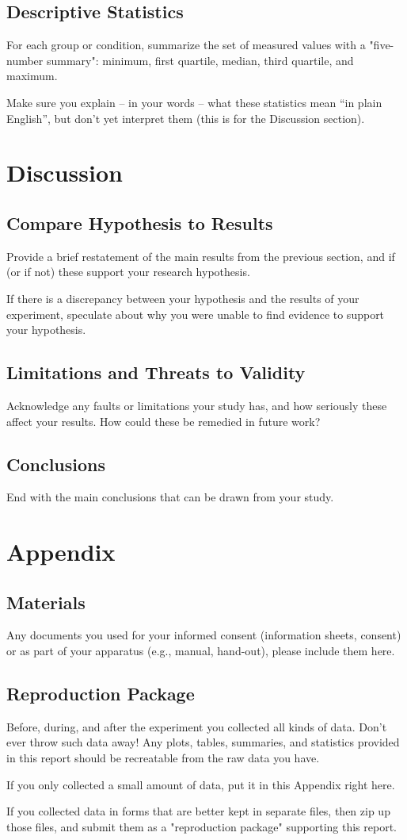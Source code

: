 \documentclass{article}
\begin{document}
\subsection{Descriptive Statistics}
For each group or condition, summarize the set of measured values with a "five-number summary": minimum, first quartile, median, third quartile, and maximum. 

Make sure you explain – in your words – what these statistics mean “in plain English”, but don’t yet interpret them (this is for the Discussion section).

\section{Discussion}
\subsection{Compare Hypothesis to Results}
Provide a brief restatement of the main results from the previous section, and if (or if not) these support your research hypothesis.

If there is a discrepancy between your hypothesis and the results of your experiment, speculate about why you were unable to find evidence to support your hypothesis. 


\subsection{Limitations and Threats to Validity}
Acknowledge any faults or limitations your study has, and how seriously these affect your
results. How could these be remedied in future work?

\subsection{Conclusions}
End with the main conclusions that can be drawn from your study.

\section{Appendix}
\subsection{Materials}
Any documents you used for your informed consent (information sheets, consent) or as part of your apparatus (e.g., manual, hand-out), please include them here.

\subsection{Reproduction Package}
Before, during, and after the experiment you collected all kinds of data. Don't ever throw such data away! Any plots, tables, summaries, and statistics provided in this report should be recreatable from the raw data you have.

If you only collected a small amount of data, put it in this Appendix right here.

If you collected data in forms that are better kept in separate files, then zip up those files, and submit them as a "reproduction package" supporting this report.
\end{document}
